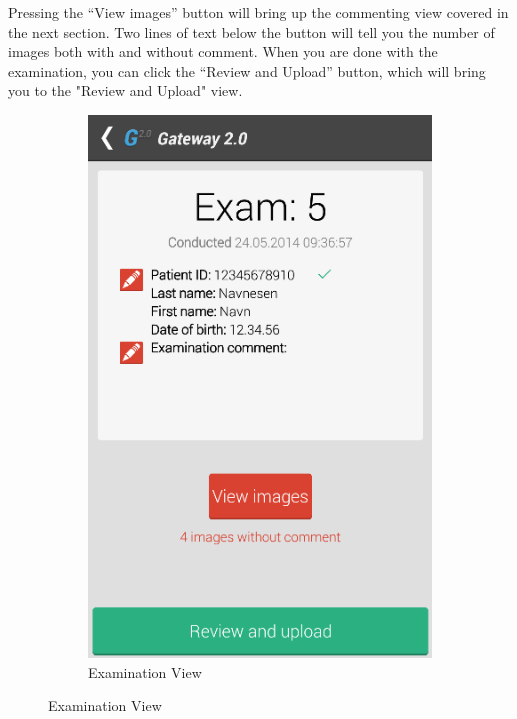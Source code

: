 Pressing the “View images” button will bring up the commenting view covered in the next section. Two lines of text below the button will tell you the number of images both with and without comment. When you are done with the examination, you can click the “Review and Upload” button, which will bring you to the "Review and Upload" view.

\begin{figure}[H]
\centering
    \begin{subfigure}[b]{0.49\textwidth}
        \includegraphics[width=\textwidth]{img/interface/4-Examination.png}
        \caption*{Examination View}
        \label{fig:04examination}
    \end{subfigure}

\end{figure}

